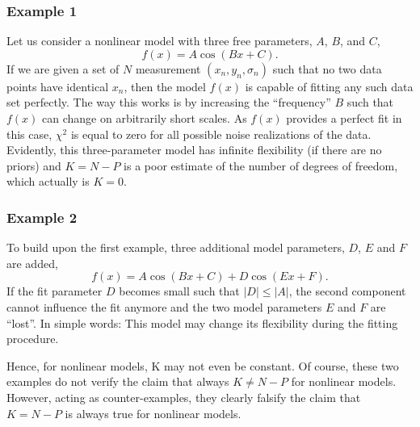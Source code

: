\subsubsection{Example 1}

Let us consider a nonlinear model with three free parameters, $A$, $B$, and $C$,
%
\begin{equation}
  f(x) = A \cos(Bx + C) .
\end{equation}
%
If we are given a set of $N$ measurement $(x_n, y_n, \sigma_n)$ such that no
two data points have identical $x_n$, then the model $f(x)$ is capable of
fitting any such data set perfectly. The way this works is by increasing the
``frequency'' $B$ such that $f(x)$ can change on arbitrarily short scales. As $f(x)$
provides a perfect fit in this case, $\chi^2$ is equal to zero for all possible
noise realizations of the data. Evidently, this three-parameter model has
infinite flexibility (if there are no priors) and $K = N - P$ is a poor estimate
of the number of degrees of freedom, which actually is $K = 0$.


\subsubsection{Example 2}

To build upon the first example, three additional model parameters, $D$, $E$
and $F$ are added,
%
\begin{equation}
  f(x) = A \cos(Bx + C) + D \cos(Ex + F) .
\end{equation}
%
If the fit parameter $D$ becomes small such that $|D| \leq |A|$, the second
component cannot influence the fit anymore and the two model parameters $E$ and
$F$ are ``lost''. In simple words: This model may change its flexibility during
the fitting procedure.

Hence, for nonlinear models, K may not even be constant. Of course, these two
examples do not verify the claim that always $K \neq N - P$ for nonlinear
models.  However, acting as counter-examples, they clearly falsify the claim
that $K = N - P$ is always true for nonlinear models.


